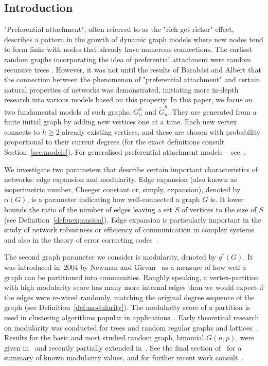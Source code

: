 \documentclass[runningheads, envcountsame, smallextended]{llncs}
\numberwithin{theorem}{section}
\numberwithin{definition}{section}
\numberwithin{lemma}{section}
\numberwithin{corollary}{section}
\numberwithin{proposition}{section}
\numberwithin{conjecture}{section}
\numberwithin{remark}{section}
\numberwithin{equation}{section}
\begin{document}
\subsection{Introduction} 
"Preferential attachment", often referred to as the "rich get richer" effect, describes a pattern in the growth of dynamic graph models where new nodes  tend to form links with nodes that already have numerous connections. 	
The earliest random graphs incorporating the idea of preferential attachment were random recursive trees \cite{Szymanski1993,Szymanski1987}. 
However, it was not until the results of  Barab{\'a}si and Albert \cite{BA_basic} that the connection between the phenomenon of "preferential attachment" and certain natural properties of networks was demonstrated, initiating more in-depth research into various models based on this property.  
In this paper, we focus on two fundamental models of such graphs, $G_n^h$ and $\tilde{G}_n^h$. They are generated from a finite initial graph by adding new vertices one at a time. Each new vertex connects to $h\ge 2$ already existing vertices, and these are chosen with probability proportional to their current degrees (for the exact definitions consult Section~\ref{sec:models}). For generalised preferential attachment models -- see~\cite{hazra2023percolation,Hofstad_2017}.

We investigate two parameters that describe certain important characteristics of networks: edge expansion and modularity. Edge expansion (also known as isoperimetric number, Cheeger constant or, simply, expansion), denoted by $\alpha(G)$, is a parameter indicating how well-connected a graph $G$ is.
It lower bounds the ratio of the number of edges leaving a set $S$ of vertices to the size of $S$ (see Definition~\ref{def:uexpansion}).  Edge expansion is particularly important in the study of network robustness or efficiency of communication in complex systems and also in the theory of error correcting codes~\cite{HoLiWi06}. 

The second graph parameter we consider is modularity, denoted by $q^*(G)$. It was introduced in~2004 by Newman and Girvan~\cite{NeGi04} as a measure of how well a graph can be partitioned into communities. Roughly speaking, a vertex-partition with high modularity score has many more internal edges than we would expect if the edges were re-wired randomly, matching the original degree sequence of the graph (see Definition~\ref{def:modularity}). The modularity score of a partition is used in clustering algorithms popular in applications~\cite{BlGuLaLe08,KaPrTh21,NeBook18,TrWaEc19}. Early theoretical research on modularity was conducted for trees \cite{Bagrow_trees_12} and random regular graphs and lattices~\cite{McSk_reg_lattice_13}.  
Results for the basic and most studied random graph, binomial $G(n,p)$, were given in~\cite{DiSk20} and recently partially extended in~\cite{RybarczykSulkowska_Gnp}. See the final section of~\cite{mcdiarmid_skerman_2025_chapter} for a summary of known modularity values, and for further recent work consult~\cite{LaSu23,LiMi22,modexpansion,Rybarczyk2025randomintersectiongraphs}.
\end{document}
